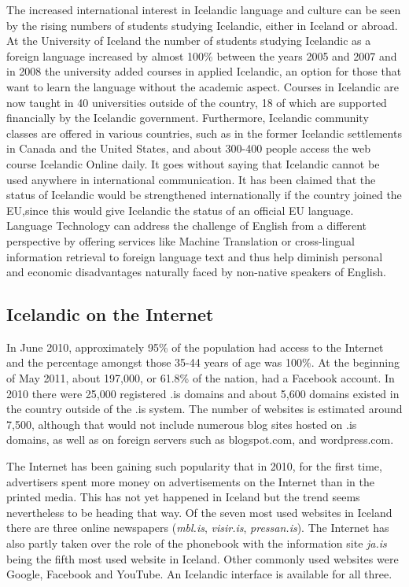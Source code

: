 \documentclass{../../metanetpaper}
\begin{document}
\begin{multicols}{2}
The increased international interest in Icelandic language and culture can be seen by the rising numbers of students studying Icelandic, either in Iceland or abroad. At the University of Iceland the number of students studying Icelandic as a foreign language increased by almost 100\% between the years 2005 and 2007 and in 2008 the university added courses in applied Icelandic, an option for those that want to learn the language without the academic aspect. Courses in Icelandic are now taught in 40 universities outside of the country, 18 of which are supported financially by the Icelandic government\cite{isl1}.  Furthermore, Icelandic community classes are offered in various countries, such as in the former Icelandic settlements in Canada and the United States, and about 300-400 people access the web course Icelandic Online daily\cite{iol1}. 
It goes without saying that Icelandic cannot be used anywhere in international communication. It has been claimed that the status of Icelandic would be strengthened internationally if the country joined the EU,\cite{vis1}since this would give Icelandic the status of an official EU language\cite{enl1}. Language Technology can address the challenge of English from a different perspective by offering services like Machine Translation or cross-lingual information retrieval to foreign language text and thus help diminish personal and economic disadvantages naturally faced by non-native speakers of English.

\subsection{Icelandic on the Internet}

In June 2010, approximately 95\% of the population had access to the Internet\cite{sta1} and the percentage amongst those 35-44 years of age was 100\%. At the beginning of May 2011, about 197,000, or 61.8\% of the nation, had a Facebook account\cite{fac1}.  
In 2010 there were 25,000 registered .is domains\cite{len1} and about 5,600 domains existed in the country outside of the .is system\cite{len2}. The number of websites is estimated around 7,500, although that would not include numerous blog sites hosted on .is domains, as well as on foreign servers such as blogspot.com, and wordpress.com. 

The Internet has been gaining such popularity that in 2010, for the first time, advertisers spent more money on advertisements on the Internet than in the printed media\cite{abs1}. This has not yet happened in Iceland but the trend seems nevertheless to be heading that way. Of the seven most used websites in Iceland there are three online newspapers (\textit{mbl.is}, \textit{visir.is}, \textit{pressan.is}). The Internet has also partly taken over the role of the phonebook with the information site \textit{ja.is} being the fifth most used website in Iceland. Other commonly used websites were Google, Facebook and YouTube\cite{abs2}. An Icelandic interface is available for all three.


\end{multicols}
\end{document}
